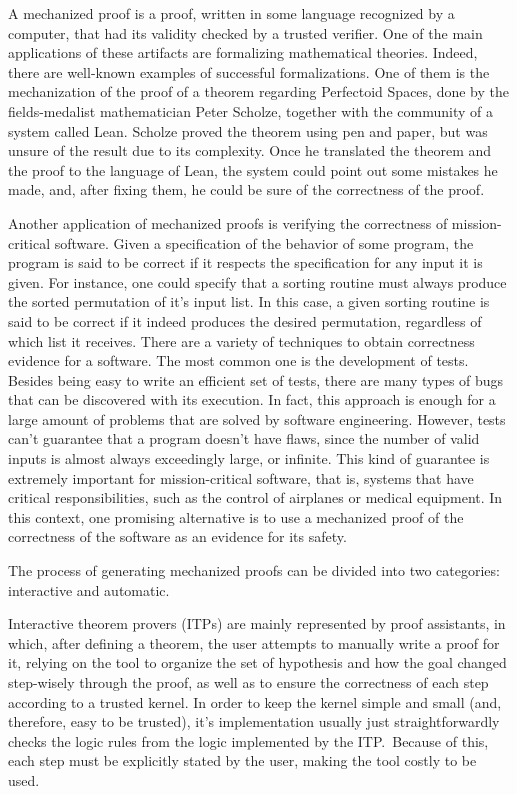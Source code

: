 A mechanized proof is a proof, written in some language recognized by a computer, that had its validity checked by a trusted verifier. One of the main applications of these artifacts are formalizing mathematical theories. Indeed, there are well-known examples of successful formalizations. One of them is the mechanization of the proof of a theorem regarding Perfectoid Spaces\cite{scholze}, done by the fields-medalist mathematician Peter Scholze, together with the community of a system called Lean\cite{lean}. Scholze proved the theorem using pen and paper, but was unsure of the result due to its complexity. Once he translated the theorem and the proof to the language of Lean, the system could point out some mistakes he made, and, after fixing them, he could be sure of the correctness of the proof.

Another application of mechanized proofs is verifying the correctness of mission-critical software. Given a specification of the behavior of some program, the program is said to be correct if it respects the specification for any input it is given. For instance, one could specify that a sorting routine must always produce the sorted permutation of it's input list. In this case, a given sorting routine is said to be correct if it indeed produces the desired permutation, regardless of which list it receives. There are a variety of techniques to obtain correctness evidence for a software. The most common one is the development of tests. Besides being easy to write an efficient set of tests, there are many types of bugs that can be discovered with its execution. In fact, this approach is enough for a large amount of problems that are solved by software engineering. However, tests can’t guarantee that a program doesn’t have flaws, since the number of valid inputs is almost always exceedingly large, or infinite. This kind of guarantee is extremely important for mission-critical software, that is, systems that have critical responsibilities, such as the control of airplanes or medical equipment. In this context, one promising alternative is to use a mechanized proof of the correctness of the software as an evidence for its safety.

The process of generating mechanized proofs can be divided into
two categories: interactive and automatic.

Interactive theorem provers (ITPs) are mainly represented by proof assistants, in which, after defining
a theorem, the user attempts to manually write a proof for it,
relying on the tool to organize the set of hypothesis and
how the goal changed step-wisely through the proof, as well as to ensure the
correctness of each step according to a trusted kernel.
%
In order to keep the kernel simple and small (and, therefore, easy to be trusted), it's implementation usually just straightforwardly checks the logic rules from the logic implemented by the ITP.\ Because of this, each step must be explicitly stated by the user, making the tool costly to be used.


